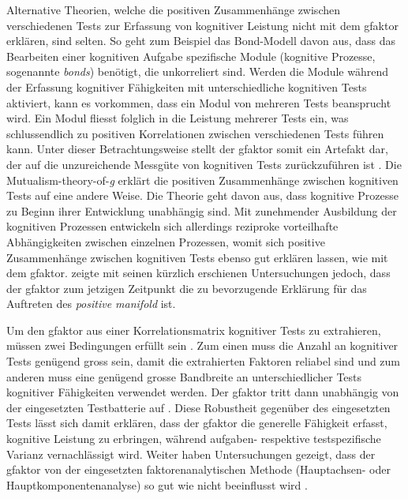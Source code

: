 \documentclass[11pt, twoside, a4paper]{book}		%
\begin{document}
Alternative Theorien, welche die positiven Zusammenhänge zwischen verschiedenen Tests zur Erfassung von kognitiver Leistung nicht mit dem \gls{gfaktor} erklären, sind selten. 
So geht zum Beispiel das Bond-Modell \citep{Thomson1916} davon aus, dass das Bearbeiten einer kognitiven Aufgabe spezifische Module (kognitive Prozesse, sogenannte \textit{bonds}) benötigt, die unkorreliert sind. Werden die Module während der Erfassung kognitiver Fähigkeiten mit unterschiedliche kognitiven Tests aktiviert, kann es vorkommen, dass ein Modul von mehreren Tests beansprucht wird. Ein Modul fliesst folglich in die Leistung mehrerer Tests ein, was schlussendlich zu positiven Korrelationen zwischen verschiedenen Tests führen kann. Unter dieser Betrachtungsweise stellt der \gls{gfaktor} somit ein Artefakt dar, der auf die unzureichende Messgüte von kognitiven Tests zurückzuführen ist \citep[für einen Gegenüberstellung zwischen dem \gls{gfaktor} und dem Bond-Modell siehe][]{Bartholomew2013}.
Die Mutualism-theory-of-\textit{g} \citep{VanDerMaas2006} erklärt die positiven Zusammenhänge zwischen kognitiven Tests auf eine andere Weise. Die Theorie geht davon aus, dass kognitive Prozesse zu Beginn ihrer Entwicklung unabhängig sind. Mit zunehmender Ausbildung der kognitiven Prozessen entwickeln sich allerdings reziproke vorteilhafte Abhängigkeiten zwischen einzelnen Prozessen, womit sich positive Zusammenhänge zwischen kognitiven Tests ebenso gut erklären lassen, wie mit dem \gls{gfaktor}. \citet{Gignac2014, Gignac2016} zeigte mit seinen kürzlich erschienen Untersuchungen jedoch, dass der \gls{gfaktor} zum jetzigen Zeitpunkt die zu bevorzugende Erklärung für das Auftreten des \textit{positive man\-i\-fold} ist. 


Um den \gls{gfaktor} aus einer Korrelationsmatrix kognitiver Tests zu extrahieren, müssen zwei Bedingungen erfüllt sein \citep[][S. 73]{Jensen1998b}. Zum einen muss die Anzahl an kognitiver Tests genügend gross sein, damit die extrahierten Faktoren reliabel sind und zum anderen muss eine genügend grosse Bandbreite an unterschiedlicher Tests kognitiver Fähigkeiten verwendet werden. Der \gls{gfaktor} tritt dann unabhängig von der eingesetzten Testbatterie auf \citep{Johnson2004, Johnson2008}. Diese Robustheit gegenüber des eingesetzten Tests lässt sich damit erklären, dass der \gls{gfaktor} die generelle Fähigkeit erfasst, kognitive Leistung zu erbringen, während aufgaben- respektive testspezifische Varianz vernachlässigt wird. Weiter haben Untersuchungen gezeigt, dass der \gls{gfaktor} von der eingesetzten faktorenanalytischen Methode (Hauptachsen- oder Hauptkomponentenanalyse) so gut wie nicht beeinflusst wird \citep{Jensen1994, Ree1991}.
\end{document}
